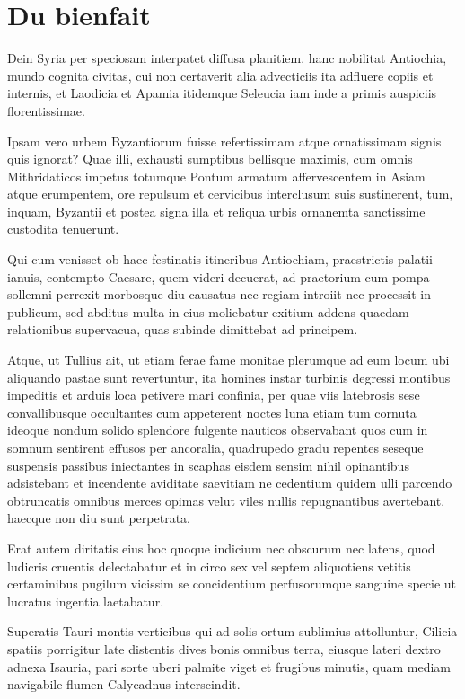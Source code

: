 
\section{Du bienfait}

Dein Syria per speciosam interpatet diffusa planitiem. hanc nobilitat Antiochia, mundo cognita civitas, cui non certaverit alia 
advecticiis ita adfluere copiis et internis, et Laodicia et Apamia itidemque Seleucia iam inde a primis auspiciis florentissimae.

Ipsam vero urbem Byzantiorum fuisse refertissimam atque ornatissimam signis quis ignorat? Quae illi, exhausti sumptibus bellisque 
maximis, cum omnis Mithridaticos impetus totumque Pontum armatum affervescentem in Asiam atque erumpentem, ore repulsum 
et cervicibus interclusum suis sustinerent, tum, inquam, Byzantii et postea signa illa et reliqua urbis ornanemta sanctissime 
custodita tenuerunt.

Qui cum venisset ob haec festinatis itineribus Antiochiam, praestrictis palatii ianuis, contempto Caesare, quem videri decuerat, ad 
praetorium cum pompa sollemni perrexit morbosque diu causatus nec regiam introiit nec processit in publicum, sed abditus multa in 
eius moliebatur exitium addens quaedam relationibus supervacua, quas subinde dimittebat ad principem.

Atque, ut Tullius ait, ut etiam ferae fame monitae plerumque ad eum locum ubi aliquando pastae sunt revertuntur, ita homines 
instar turbinis degressi montibus impeditis et arduis loca petivere mari confinia, per quae viis latebrosis sese convallibusque 
occultantes cum appeterent noctes luna etiam tum cornuta ideoque nondum solido splendore fulgente nauticos observabant quos 
cum in somnum sentirent effusos per ancoralia, quadrupedo gradu repentes seseque suspensis passibus iniectantes in scaphas 
eisdem sensim nihil opinantibus adsistebant et incendente aviditate saevitiam ne cedentium quidem ulli parcendo obtruncatis 
omnibus merces opimas velut viles nullis repugnantibus avertebant. haecque non diu sunt perpetrata.

Erat autem diritatis eius hoc quoque indicium nec obscurum nec latens, quod ludicris cruentis delectabatur et in circo sex vel 
septem aliquotiens vetitis certaminibus pugilum vicissim se concidentium perfusorumque sanguine specie ut lucratus ingentia 
laetabatur.

Superatis Tauri montis verticibus qui ad solis ortum sublimius attolluntur, Cilicia spatiis porrigitur late distentis dives bonis omnibus 
terra, eiusque lateri dextro adnexa Isauria, pari sorte uberi palmite viget et frugibus minutis, quam mediam navigabile flumen 
Calycadnus interscindit.

